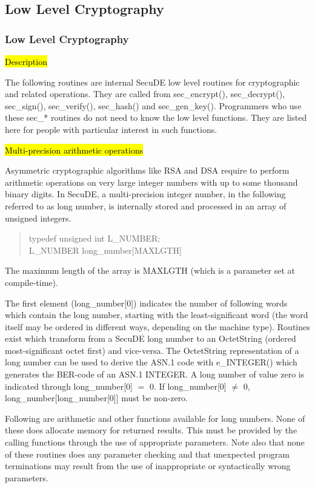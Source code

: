 \subsection{Low Level Cryptography}         


\subsubsection{Low Level Cryptography}
\label{lowlevel}

\hl{Description}

The following routines are internal SecuDE low level routines for cryptographic and related
operations. They are called from sec\_encrypt(), sec\_decrypt(), sec\_sign(), sec\_verify(),
sec\_hash() and sec\_gen\_key(). Programmers who use these sec\_* routines do not need to know
the low level functions. They are listed here for people with particular interest
in such functions.

\hl{Multi-precision arithmetic operations}

Asymmetric cryptographic algorithms like RSA and DSA require to perform arithmetic operations
on very large integer numbers with up to some thousand binary digits. In SecuDE,
a multi-precision integer number, in the following referred to as long number, is internally stored 
and processed in an array of unsigned integers.
\begin{quote}
typedef unsigned int L\_NUMBER; \\
L\_NUMBER long\_number[MAXLGTH]
\end{quote}
The maximum length of the array is MAXLGTH (which is a parameter set at compile-time). 

The first element (long\_number[0]) indicates the number of
following words which contain the long number, starting with
the least-significant word (the word itself may be ordered in different ways,
depending on the machine type). Routines exist which transform from a SecuDE
long number to an OctetString (ordered most-significant octet first) and vice-versa.
The OctetString representation of a long number can be used to derive the ASN.1 code
with e\_INTEGER() which generates the BER-code of an ASN.1 INTEGER.
A long number of value zero is indicated through long\_number[0] $=$ 0. If long\_number[0] $\neq$ 0,
long\_number[long\_number[0]] must be non-zero.

Following are arithmetic and other functions available for long numbers. None of
these does allocate memory for returned results. This must be provided by the
calling functions through the use of appropriate parameters. Note also that none of
these routines does any parameter checking and that unexpected program terminations
may result from the use of inappropriate or syntactically wrong parameters. 
\\ [1ex]

